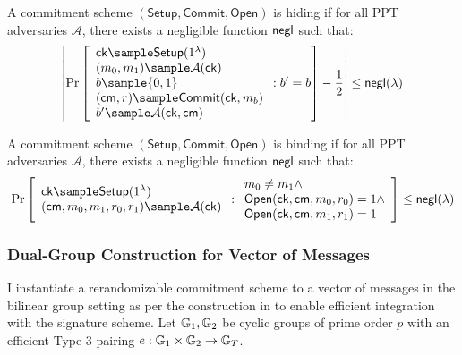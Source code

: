 \begin{definition}[Hiding]
A commitment scheme $(\mathsf{Setup}, \mathsf{Commit}, \mathsf{Open})$ is hiding if for all PPT adversaries $\mathcal{A}$, there exists a negligible function $\mathsf{negl}$ such that:
$$\left|\Pr\left[\begin{array}{l}
    \mathsf{ck} \sample \mathsf{Setup}(1^\lambda) \\
    (m_0, m_1) \sample \mathcal{A}(\mathsf{ck}) \\
    b \sample \{0,1\} \\
    (\mathsf{cm}, r) \sample \mathsf{Commit}(\mathsf{ck}, m_b) \\
    b' \sample \mathcal{A}(\mathsf{ck}, \mathsf{cm})
\end{array} : b' = b\right] - \frac{1}{2}\right| \leq \negl(\lambda)$$
\end{definition}

\begin{definition}[Binding]
A commitment scheme $(\mathsf{Setup}, \mathsf{Commit}, \mathsf{Open})$ is binding if for all PPT adversaries $\mathcal{A}$, there exists a negligible function $\mathsf{negl}$ such that:
$$\Pr\left[\begin{array}{l}
    \mathsf{ck} \sample \mathsf{Setup}(1^\lambda) \\
    (\mathsf{cm}, m_0, m_1, r_0, r_1) \sample \mathcal{A}(\mathsf{ck})
\end{array} : \begin{array}{l}
    m_0 \neq m_1 \land \\
    \mathsf{Open}(\mathsf{ck}, \mathsf{cm}, m_0, r_0) = 1 \land \\
    \mathsf{Open}(\mathsf{ck}, \mathsf{cm}, m_1, r_1) = 1
\end{array}\right] \leq \negl(\lambda)$$
\end{definition}



\subsubsection{Dual-Group Construction for Vector of Messages}

I instantiate a rerandomizable commitment scheme to a vector of messages in the bilinear group setting as per the construction in \cite{tomescu_utt_2022} to enable efficient integration with the signature scheme. Let $\mathbb{G}_1, \mathbb{G}_2$ be cyclic groups of prime order $p$ with an efficient Type-3 pairing $e: \mathbb{G}_1 \times \mathbb{G}_2 \to \mathbb{G}_T$.

